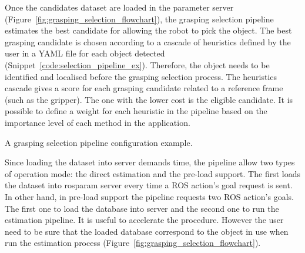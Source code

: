 Once the candidates dataset are loaded in the parameter server (Figure~\ref{fig:grasping_selection_flowchart}), the grasping selection pipeline estimates the best candidate for allowing the robot to pick the object. The best grasping candidate is chosen according to a cascade of heuristics defined by the user in a YAML file for each object detected (Snippet~\ref{code:selection_pipeline_ex}). Therefore, the object needs to be identified and localised before the grasping selection process. The heuristics cascade gives a score for each grasping candidate related to a reference frame (such as the gripper). The one with the lower cost is the eligible candidate. It is possible to define a weight for each heuristic in the pipeline based on the importance level of each method in the application.

\begin{snippet}[h!]
\centering
{}
\caption{A grasping selection pipeline configuration example.}
\label{code:selection_pipeline_ex}
\end{snippet}

Since loading the dataset into server demands time, the pipeline allow two types of operation mode: the direct estimation and the pre-load support. The first loads the dataset into rosparam server every time a ROS action's goal request is sent. In other hand, in pre-load support the pipeline requests two ROS action's goals. The first one to load the database into server and the second one to run the estimation pipeline. It is useful to accelerate the procedure. However the user need to be sure that the loaded database correspond to the object in use when run the estimation process (Figure~\ref{fig:grasping_selection_flowchart}).

